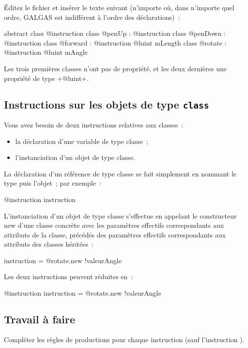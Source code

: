 Éditez le fichier  et insérer le texte suivant (n’importe où, dans n’importe quel ordre, GALGAS est indifférent à l’ordre des déclarations)~:

\begin{galgas}
abstract class @instruction {
}
class @penUp : @instruction {
}
class @penDown : @instruction {
}
class @forward : @instruction {
  @luint mLength
}
class @rotate : @instruction {
  @luint mAngle
}
\end{galgas}


Les trois premières classes n'ont pas de propriété, et les deux dernières une propriété de type \ggs+@luint+.

\subsection{Instructions sur les objets de type \texttt{class}}

Vous avez besoin de deux instructions relatives aux classes~:
\begin{itemize}
  \item la déclaration d'une variable de type classe~;
  \item l'instanciation d'un objet de type classe.
\end{itemize}

La déclaration d'un référence de type classe se fait simplement en nommant le type puis l'objet~; par exemple~:
\begin{galgas}
@instruction instruction
\end{galgas}

L'instanciation d'un objet de type classe s'effectue en appelant le constructeur new d'une classe concrète avec les paramètres effectifs correspondants aux attributs de la classe, précédés des paramètres effectifs correspondants aux attributs des classes héritées~:
\begin{galgas}
instruction = @rotate.new {!valeurAngle}
\end{galgas}

Les deux instructions peuvent réduites en~:
\begin{galgas}
@instruction instruction = @rotate.new {!valeurAngle}
\end{galgas}

\subsection{Travail à faire}
Compléter les règles de productions pour chaque instruction (sauf l'instruction ).

